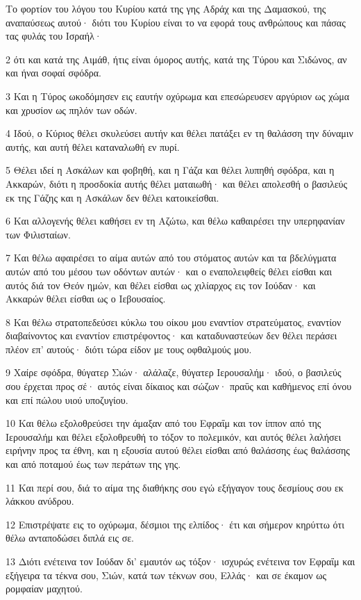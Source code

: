 \par Το φορτίον του λόγου του Κυρίου κατά της γης Αδράχ και της Δαμασκού, της αναπαύσεως αυτού· διότι του Κυρίου είναι το να εφορά τους ανθρώπους και πάσας τας φυλάς του Ισραήλ·
\par 2 ότι και κατά της Αιμάθ, ήτις είναι όμορος αυτής, κατά της Τύρου και Σιδώνος, αν και ήναι σοφαί σφόδρα.
\par 3 Και η Τύρος ωκοδόμησεν εις εαυτήν οχύρωμα και επεσώρευσεν αργύριον ως χώμα και χρυσίον ως πηλόν των οδών.
\par 4 Ιδού, ο Κύριος θέλει σκυλεύσει αυτήν και θέλει πατάξει εν τη θαλάσση την δύναμιν αυτής, και αυτή θέλει καταναλωθή εν πυρί.
\par 5 Θέλει ιδεί η Ασκάλων και φοβηθή, και η Γάζα και θέλει λυπηθή σφόδρα, και η Ακκαρών, διότι η προσδοκία αυτής θέλει ματαιωθή· και θέλει απολεσθή ο βασιλεύς εκ της Γάζης και η Ασκάλων δεν θέλει κατοικείσθαι.
\par 6 Και αλλογενής θέλει καθήσει εν τη Αζώτω, και θέλω καθαιρέσει την υπερηφανίαν των Φιλισταίων.
\par 7 Και θέλω αφαιρέσει το αίμα αυτών από του στόματος αυτών και τα βδελύγματα αυτών από του μέσου των οδόντων αυτών· και ο εναπολειφθείς θέλει είσθαι και αυτός διά τον Θεόν ημών, και θέλει είσθαι ως χιλίαρχος εις τον Ιούδαν· και Ακκαρών θέλει είσθαι ως ο Ιεβουσαίος.
\par 8 Και θέλω στρατοπεδεύσει κύκλω του οίκου μου εναντίον στρατεύματος, εναντίον διαβαίνοντος και εναντίον επιστρέφοντος· και καταδυναστεύων δεν θέλει περάσει πλέον επ' αυτούς· διότι τώρα είδον με τους οφθαλμούς μου.
\par 9 Χαίρε σφόδρα, θύγατερ Σιών· αλάλαζε, θύγατερ Ιερουσαλήμ· ιδού, ο βασιλεύς σου έρχεται προς σέ· αυτός είναι δίκαιος και σώζων· πραΰς και καθήμενος επί όνου και επί πώλου υιού υποζυγίου.
\par 10 Και θέλω εξολοθρεύσει την άμαξαν από του Εφραΐμ και τον ίππον από της Ιερουσαλήμ και θέλει εξολοθρευθή το τόξον το πολεμικόν, και αυτός θέλει λαλήσει ειρήνην προς τα έθνη, και η εξουσία αυτού θέλει είσθαι από θαλάσσης έως θαλάσσης και από ποταμού έως των περάτων της γης.
\par 11 Και περί σου, διά το αίμα της διαθήκης σου εγώ εξήγαγον τους δεσμίους σου εκ λάκκου ανύδρου.
\par 12 Επιστρέψατε εις το οχύρωμα, δέσμιοι της ελπίδος· έτι και σήμερον κηρύττω ότι θέλω ανταποδώσει διπλά εις σε.
\par 13 Διότι ενέτεινα τον Ιούδαν δι' εμαυτόν ως τόξον· ισχυρώς ενέτεινα τον Εφραΐμ και εξήγειρα τα τέκνα σου, Σιών, κατά των τέκνων σου, Ελλάς· και σε έκαμον ως ρομφαίαν μαχητού.
